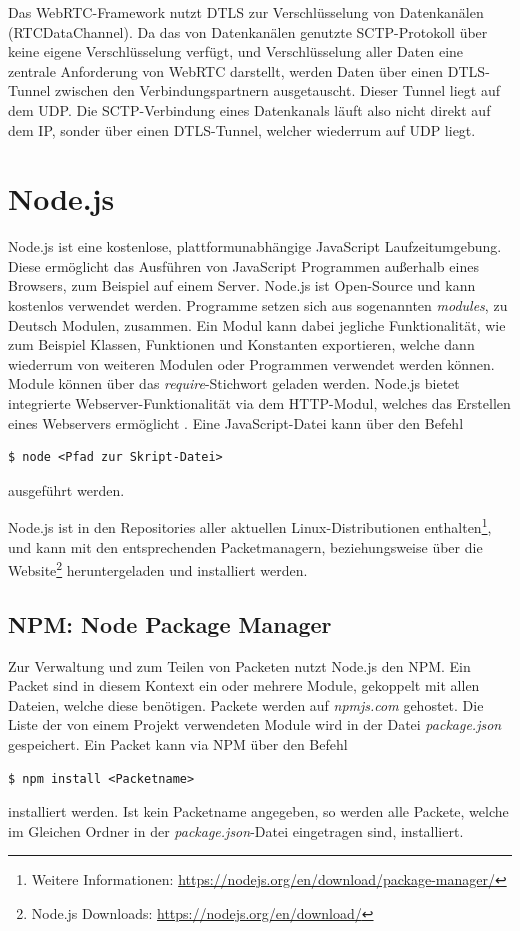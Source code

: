 Das \acs{WebRTC}-Framework nutzt \acs{DTLS} zur Verschlüsselung von Datenkanälen (RTCDataChannel). Da das von Datenkanälen genutzte \acs{SCTP}-Protokoll über keine eigene Verschlüsselung verfügt, und Verschlüsselung aller Daten eine zentrale Anforderung von \acs{WebRTC} darstellt, werden Daten über einen \acs{DTLS}-Tunnel zwischen den Verbindungspartnern ausgetauscht. Dieser Tunnel liegt auf dem \acf{UDP}. Die \acs{SCTP}-Verbindung eines Datenkanals läuft also nicht direkt auf dem \acf{IP}, sonder über einen \acs{DTLS}-Tunnel, welcher wiederrum auf \acs{UDP} liegt.

\section{Node.js}
Node.js ist eine kostenlose, plattformunabhängige JavaScript Laufzeitumgebung.
Diese ermöglicht das Ausführen von JavaScript Programmen außerhalb eines Browsers, zum Beispiel auf einem Server. Node.js ist Open-Source und kann kostenlos verwendet werden. Programme setzen sich aus sogenannten \textit{modules}, zu Deutsch Modulen, zusammen. Ein Modul kann dabei jegliche Funktionalität, wie zum Beispiel Klassen, Funktionen und Konstanten exportieren, welche dann wiederrum von weiteren Modulen oder Programmen verwendet werden können. Module können über das \textit{require}-Stichwort geladen werden. Node.js bietet integrierte Webserver-Funktionalität via dem \acs{HTTP}-Modul, welches das Erstellen eines Webservers ermöglicht \cite{nodejs}. Eine JavaScript-Datei kann über den Befehl
\lstset{style=STYLE_COMMAND_LINE_ARGUMENT_SINGLE_LINE}
\begin{lstlisting}[belowskip=-0.8 \baselineskip]
$ node <Pfad zur Skript-Datei>
\end{lstlisting}
ausgeführt werden.\par 

Node.js ist in den Repositories aller aktuellen Linux-Distributionen enthalten\footnote{Weitere Informationen: \url{https://nodejs.org/en/download/package-manager/}}, und kann mit den entsprechenden Packetmanagern, beziehungsweise über die Website\footnote{Node.js Downloads: \url{https://nodejs.org/en/download/}} heruntergeladen und installiert werden.\par

\subsection{NPM: Node Package Manager}
Zur Verwaltung und zum Teilen von Packeten nutzt Node.js den \ac{NPM}. Ein Packet sind in diesem Kontext ein oder mehrere Module, gekoppelt mit allen Dateien, welche diese benötigen. Packete werden auf \textit{npmjs.com} gehostet. Die Liste der von einem Projekt verwendeten Module wird in der Datei \textit{package.json} gespeichert. Ein Packet kann via NPM über den Befehl
\lstset{style=STYLE_COMMAND_LINE_ARGUMENT_SINGLE_LINE}
\begin{lstlisting}[belowskip=-0.8 \baselineskip]
$ npm install <Packetname>
\end{lstlisting}
installiert werden. Ist kein Packetname angegeben, so werden alle Packete, welche im Gleichen Ordner in der \textit{package.json}-Datei eingetragen sind, installiert.

